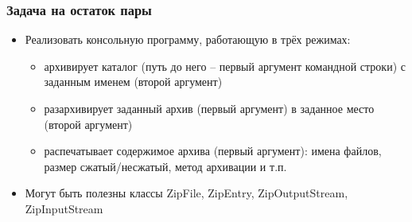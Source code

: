 \documentclass[xetex,mathserif,serif]{beamer}
\begin{document}
	\begin{frame}
		\frametitle{Задача на остаток пары}
		\begin{itemize}
			\item Реализовать консольную программу, работающую в трёх режимах:
			\begin{itemize}
				\item архивирует каталог (путь до него -- первый аргумент командной строки) с заданным именем (второй аргумент)
				\item разархивирует заданный архив (первый аргумент) в заданное место (второй аргумент)
				\item распечатывает содержимое архива (первый аргумент): имена файлов, размер сжатый/несжатый, метод архивации и т.п.
			\end{itemize}
			\item Могут быть полезны классы ZipFile, ZipEntry, ZipOutputStream, ZipInputStream
		\end{itemize}
	\end{frame}
\end{document}
